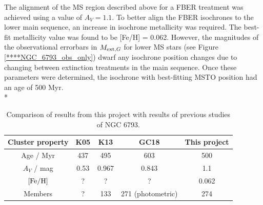 \documentclass[12pt, a4paper]{report}
\begin{document}
The alignment of the MS region described above for a FBER treatment was achieved using a value of $A_{V} = 1.1$. To better align the FBER isochrones to the lower main sequence, an increase in isochrone metallicity was required. The best-fit metallicity value was found to be [Fe/H] = 0.062. However, the magnitudes of the observational errorbars in $M_{\textnormal{ext},G}$ for lower MS stars (see Figure \ref{****NGC_6793_obs_only}) dwarf any isochrone position changes due to changing between extinction treatments in the main sequence. Once these parameters were determined, the isochrone with best-fitting MSTO position had an age of 500 Myr.\\*


\begin{table}
\begin{center}
\begin{tabular}{ccccc}
\hline
Cluster property & K05 & K13 & GC18 & This project \\
\hline
Age / Myr & 437 & 495 & 603 & 500 \\
$A_{V}$ / mag & 0.53 & 0.967 & 0.843 & 1.1 \\
$\textnormal{[Fe/H]}$ & ? & ? & ? & 0.062 \\
Members & ? & 133 & 271 (photometric) & 274 \\
\hline
\end{tabular}
\caption{Comparison of results from this project with results of previous studies of NGC 6793.}
\label{NGC6793_result}
\end{center}
\end{table}
\end{document}
